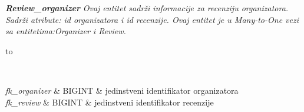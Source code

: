 			\textit{\bf Review\_organizer}
			\textit{Ovaj entitet sadrži informacije za recenziju organizatora. Sadrži atribute: id organizatora i id recenzije. Ovaj entitet je u \emph{Many-to-One} vezi  sa entitetima:Organizer i Review.}
			\begin{longtabu} to \textwidth {|X[6, l+3]|X[6, l]|X[20, l]|}

				\hline {}	 \\[3pt] \hline
				\endfirsthead

				\hline
				\endlastfoot

				\textit{fk\_organizer} & BIGINT	&  	jedinstveni identifikator organizatora 	\\ \hline
				\textit{fk\_review}	& BIGINT &  jedinstveni identifikator recenzije	\\ \hline

			\end{longtabu}


